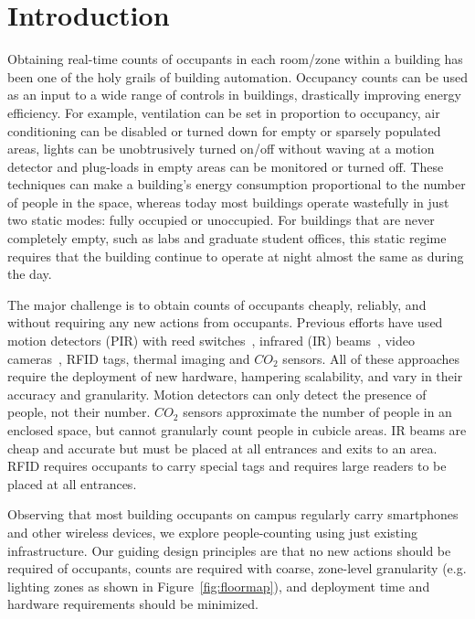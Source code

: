 \section{Introduction}

Obtaining real-time counts of occupants in each room/zone within a building has been one of the holy grails of building automation. Occupancy counts can be used as an input to a wide range of controls in buildings, drastically improving energy efficiency. For example,  ventilation can be set in proportion to occupancy, air conditioning can be disabled or turned down for empty or sparsely populated areas, lights can be unobtrusively turned on/off without waving at a motion detector and plug-loads in empty areas can be monitored or turned off. These techniques can make a building's energy consumption proportional to the number of people in the space, whereas today most buildings operate wastefully in just two static modes: fully occupied or unoccupied. For buildings that are never completely empty, such as labs and graduate student offices, this static regime requires that the building continue to operate at night almost the same as during the day.

The major challenge is to obtain counts of occupants cheaply, reliably, and without requiring any new actions from occupants. Previous efforts have used motion detectors (PIR) with reed switches~\cite{Agarwal2010, Lu2010}, infrared (IR) beams~\cite{sun9}, video cameras~\cite{Erickson11}, RFID tags, thermal imaging and $CO_2$ sensors. All of these approaches require the deployment of new hardware, hampering scalability, and vary in their accuracy and granularity. Motion detectors can only detect the presence of people, not their number. $CO_2$ sensors approximate the number of people in an enclosed space, but cannot granularly count people in cubicle areas. IR beams are cheap and accurate but must be placed at all entrances and exits to an area. RFID requires occupants to carry special tags and requires large readers to be placed at all entrances. 

Observing that most building occupants on campus regularly carry smartphones and other wireless devices, we explore people-counting using just existing infrastructure. Our guiding design principles are that no new actions should be required of occupants, counts are required with coarse, zone-level granularity (e.g. lighting zones as shown in Figure~\ref{fig:floormap}), and deployment time and hardware requirements should be minimized.

